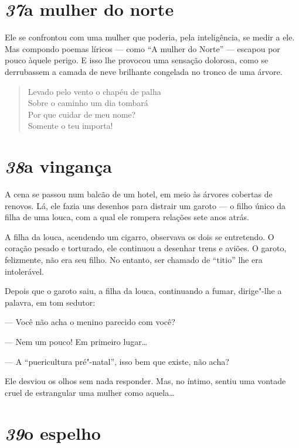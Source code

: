 \section*{\textit{37}\es a mulher do norte}

Ele se confrontou com uma mulher que poderia, pela inteligência, se
medir a ele. Mas compondo poemas líricos --- como ``A mulher do Norte'' ---
escapou por pouco àquele perigo. E isso lhe provocou uma sensação
dolorosa, como se derrubassem a camada de neve brilhante congelada no
tronco de uma árvore.

\begin{verse}
Levado pelo vento o chapéu de palha\\
Sobre o caminho um dia tombará\\
Por que cuidar de meu nome?\\
Somente o teu importa!
\end{verse}

\section*{\textit{38}\es a vingança}

A cena se passou num balcão de um hotel, em meio às árvores cobertas de
renovos. Lá, ele fazia uns desenhos para distrair um garoto --- o filho
único da filha de uma louca, com a qual ele rompera relações sete anos
atrás.

A filha da louca, acendendo um cigarro, observava os dois se entretendo.
O coração pesado e torturado, ele continuou a desenhar trens e aviões.
O garoto, felizmente, não era seu filho. No entanto, ser chamado de
``titio'' lhe era intolerável.

Depois que o garoto saiu, a filha da louca, continuando a fumar,
dirige"-lhe a palavra, em tom sedutor:

--- Você não acha o menino parecido com você?

--- Nem um pouco! Em primeiro lugar\ldots{}

--- A ``puericultura pré"-natal'', isso bem que existe, não acha?

Ele desviou os olhos sem nada responder. Mas, no íntimo, sentiu uma
vontade cruel de estrangular uma mulher como aquela\ldots{}

\section*{\textit{39}\es o espelho}

